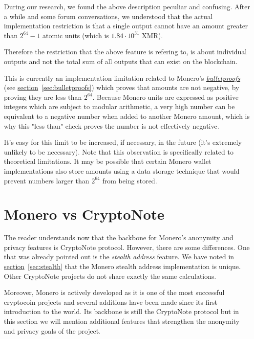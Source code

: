 During our research, we found the above description peculiar and confusing. After a while and some forum conversations, we understood that the actual implementation restriction is that a single output cannot have an amount greater than $2^{64} − 1$ atomic units (which is $1.84 \cdot 10^{31}$ XMR).

Therefore the restriction that the above feature is refering to, is about individual outputs and not the total sum of all outputs that can exist on the blockchain.
\vspace{0.2cm}

This is currently an implementation limitation related to Monero's \hyperref[sec:bulletproofs]{\emph{bulletproofs}}~\cite{getmonero} (see \hyperref[sec:bulletproofs]{section}~\ref{sec:bulletproofs}) which proves that amounts are not negative, by proving they are less than $2^{64}$. Because Monero units are expressed as positive integers which are subject to modular arithmetic, a very high number can be equivalent to a negative number when added to another Monero amount, which is why this "less than" check proves the number is not effectively negative.

It's easy for this limit to be increased, if necessary, in the future (it's extremely unlikely to be necessary). Note that this observation is specifically related to theoretical limitations. It may be possible that certain Monero wallet implementations also store amounts using a data storage technique that would prevent numbers larger than $2^{64}$ from being stored.
\clearpage
\pagebreak

\section{Monero vs CryptoNote}
The reader understands now that the backbone for Monero's anonymity and privacy features is CryptoNote protocol. However, there are some differences. One that was already pointed out is the \hyperref[sec:stealth]{\emph{stealth address}} feature. We have noted in \hyperref[sec:stealth]{section}~\ref{sec:stealth} that the Monero stealth address implementation is unique. Other CryptoNote projects do not share exactly the same calculations.

Moreover, Monero is actively developed as it is one of the most successful cryptocoin projects and several additions have been made since its first introduction to the world. Its backbone is still the CryptoNote protocol but in this section we will mention additional features that strengthen the anonymity and privacy goals of the project.

